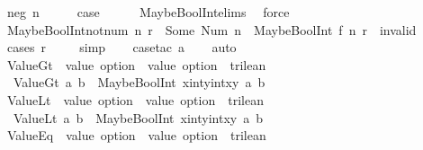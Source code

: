 \begin{isabellebody}
\ {\isacharparenleft}neg\ n{\isacharparenright}\isanewline
\ \ \isamarkupfalse%
\ \isamarkupfalse%
\ {\isacharquery}case\isanewline
\ \ \ \ \isamarkupfalse%
\ MaybeBoolInt{\isachardot}elims\ \isamarkupfalse%
\ force\isanewline
{}\isamarkupfalse%
%
\endisatagproof
{\isafoldproof}%
%
\isadelimproof
\isanewline
%
\endisadelimproof
\isanewline
{}\isamarkupfalse%
\ MaybeBoolInt{\isacharunderscore}not{\isacharunderscore}num{\isacharunderscore}{}{\isacharcolon}\ {\isachardoublequoteopen}{\isasymforall}n{\isachardot}\ r\ {\isasymnoteq}\ Some\ {\isacharparenleft}Num\ n{\isacharparenright}\ {\isasymLongrightarrow}\ MaybeBoolInt\ f\ n\ r\ {\isacharequal}\ invalid{\isachardoublequoteclose}\isanewline
%
\isadelimproof
\ \ %
\endisadelimproof
%
\isatagproof
{}\isamarkupfalse%
\ {\isacharparenleft}cases\ r{\isacharparenright}\isanewline
\ \ \ \isamarkupfalse%
\ simp\isanewline
\ \ \isamarkupfalse%
\ {\isacharparenleft}case{\isacharunderscore}tac\ a{\isacharparenright}\isanewline
\ \ \isamarkupfalse%
\ auto%
\endisatagproof
{\isafoldproof}%
%
\isadelimproof
\isanewline
%
\endisadelimproof
\isanewline
{}\isamarkupfalse%
\ ValueGt\ {\isacharcolon}{\isacharcolon}\ {\isachardoublequoteopen}value\ option\ {\isasymRightarrow}\ value\ option\ {\isasymRightarrow}\ trilean{\isachardoublequoteclose}\ \ \isanewline
\ \ {\isachardoublequoteopen}ValueGt\ a\ b\ {\isasymequiv}\ MaybeBoolInt\ {\isacharparenleft}{\isasymlambda}x{\isacharcolon}{\isacharcolon}int{\isachardot}{\isasymlambda}y{\isacharcolon}{\isacharcolon}int{\isachardot}{\isacharparenleft}x{\isachargreater}y{\isacharparenright}{\isacharparenright}\ a\ b{\isachardoublequoteclose}\isanewline
\isanewline
{}\isamarkupfalse%
\ ValueLt\ {\isacharcolon}{\isacharcolon}\ {\isachardoublequoteopen}value\ option\ {\isasymRightarrow}\ value\ option\ {\isasymRightarrow}\ trilean{\isachardoublequoteclose}\ \ \isanewline
\ \ {\isachardoublequoteopen}ValueLt\ a\ b\ {\isasymequiv}\ MaybeBoolInt\ {\isacharparenleft}{\isasymlambda}x{\isacharcolon}{\isacharcolon}int{\isachardot}{\isasymlambda}y{\isacharcolon}{\isacharcolon}int{\isachardot}{\isacharparenleft}x{\isacharless}y{\isacharparenright}{\isacharparenright}\ a\ b{\isachardoublequoteclose}\isanewline
\isanewline
{}\isamarkupfalse%
\ ValueEq\ {\isacharcolon}{\isacharcolon}\ {\isachardoublequoteopen}value\ option\ {\isasymRightarrow}\ value\ option\ {\isasymRightarrow}\ trilean{\isachardoublequoteclose}\ \ \isanewline

\end{isabellebody}
